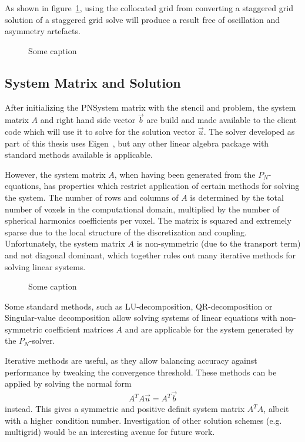 As shown in figure~\ref{fig:pn_staggered_grid_noartefacts}, using the collocated grid from converting a staggered grid solution of a staggered grid solve will produce a result free of oscillation and asymmetry artefacts.
\begin{figure}[h]
\centering
{}
\caption{Some caption}
\label{fig:pn_staggered_grid_noartefacts}
\end{figure}

\subsection{System Matrix and Solution}
\label{sec:pn_system_matrix}

After initializing the PNSystem matrix with the stencil and problem, the system matrix $A$ and right hand side vector $\vec{b}$ are build and made available to the client code which will use it to solve for the solution vector $\vec{u}$. The solver developed as part of this thesis uses Eigen~\cite{Eigen}, but any other linear algebra package with standard methods available is applicable. 

However, the system matrix $A$, when having been generated from the $P_N$-equations, has properties which restrict application of certain methods for solving the system. The number of rows and columns of $A$ is determined by the total number of voxels in the computational domain, multiplied by the number of spherical harmonics coefficients per voxel. The matrix is squared and extremely sparse due to the local structure of the discretization and coupling. Unfortunately, the system matrix $A$ is non-symmetric (due to the transport term) and not diagonal dominant, which together rules out many iterative methods for solving linear systems.
\begin{figure}[h]
\centering
{}
\caption{Some caption}
\label{fig:pn_matrix_layout}
\end{figure}

Some standard methods, such as LU-decomposition, QR-decomposition or Singular-value decomposition allow solving systems of linear equations with non-symmetric coefficient matrices $A$ and are applicable for the system generated by the $P_N$-solver. 

Iterative methods are useful, as they allow balancing accuracy against performance by tweaking the convergence threshold. These methods can be applied by solving the normal form
\begin{align}
A^TA\vec{u} = A^T\vec{b}
\end{align}
instead. This gives a symmetric and positive definit system matrix $A^TA$, albeit with a higher condition number. Investigation of other solution schemes (e.g. multigrid) would be an interesting avenue for future work.

